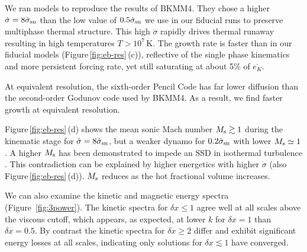 \documentclass[preprint2]{aastex63}
\newcommand\SNr{\dot\sigma_{\rm sn}}
\newcommand\Ms{M_{\rm s}}
\newcommand\dx{ {\delta x}}
\newcommand\BKM{{\sf BKMM4}}
\newcommand{\fg}[1]{\textcolor{mypurple}{#1}}
\begin{document}
 \fg{We ran models to reproduce the results of \BKM. They chose a higher
 $\dot\sigma = 8\SNr$ than the low value of $0.5\SNr$ we use in our
   fiducial runs} to preserve multiphase thermal structure.
 This high $\dot\sigma$ rapidly drives thermal runaway resulting in high
 temperatures $T>10^7$\,K.
 The growth rate is faster {than in our fiducial models} (Figure\,\ref{fig:eb-res}\,(c)), reflective of the
 single phase kinematics and more persistent forcing rate, yet {still}
 saturating at about 5\% of $\overline{e_K}$.
 {At equivalent resolution, the sixth-order Pencil Code has far lower diffusion
 than the second-order Godunov code used by \BKM. As a result, we find faster
 growth at equivalent resolution.
 
 \fg{Figure\,\ref{fig:eb-res}\,(d) shows the mean sonic Mach number
 $\Ms\gtrsim1$ during the kinematic stage for $\dot\sigma=8\SNr$, but
 a weaker dynamo for $0.2\SNr$ with lower $\Ms\simeq1$.}
 A higher $\Ms$ has been demonstrated to impede an SSD in isothermal turbulence
 \citep{Haugen:2004M}.
 \fg{This contradiction can be explained by higher energetics
 with higher $\dot\sigma$ (also Figure\,\ref{fig:eb-res}\,(d)).
 $\Ms$ reduces as the hot fractional volume increases.
 }

 We can also examine the
      \fg{kinetic and magnetic}
   energy spectra (Figure~\ref{fig:3power}).
   The kinetic spectra
   for $\dx\leq1$ agree well at 
 all scales above the viscous cutoff, which appears, as expected, at lower $k$ for
 $\dx=1$ than $\dx=0.5$.
 By contrast the kinetic spectra for $\dx\geq2$ differ and exhibit significant
 energy losses at all scales,    
 indicating only solutions for $\dx\lesssim1$ have converged.

}
\end{document}
